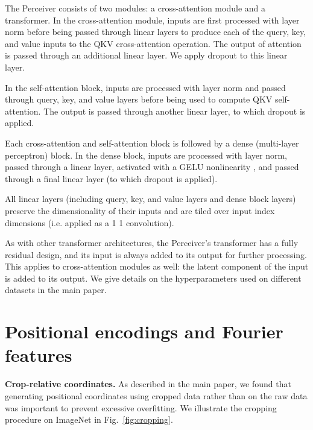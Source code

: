 \documentclass{article}
\begin{document}
The Perceiver consists of two modules: a cross-attention module and a transformer. In the cross-attention module, inputs are first processed with layer norm \cite{ba2016layer} before being passed through linear layers to produce each of the query, key, and value inputs to the QKV cross-attention operation. The output of attention is passed through an additional linear layer. We apply dropout to this linear layer.

In the self-attention block, inputs are processed with layer norm and passed through query, key, and value layers before being used to compute QKV self-attention. The output is passed through another linear layer, to which dropout is applied.

Each cross-attention and self-attention block is followed by a dense (multi-layer perceptron) block. In the dense block, inputs are processed with layer norm, passed through a linear layer, activated with a GELU nonlinearity \cite{hendrycks2016gelu}, and passed through a final linear layer (to which dropout is applied).


All linear layers (including query, key, and value layers and dense block layers) preserve the dimensionality of their inputs and are tiled over input index dimensions (i.e. applied as a 1  1 convolution).

As with other transformer architectures, the Perceiver's transformer has a fully residual design, and its input is always added to its output for further processing. This applies to cross-attention modules as well: the latent component of the input is added to its output. We give details on the hyperparameters used on different datasets in the main paper.




\section{Positional encodings and Fourier features}

\noindent \textbf{Crop-relative coordinates.} As described in the main paper, we found that generating positional coordinates using cropped data rather than on the raw data was important to prevent excessive overfitting. We illustrate the cropping procedure on ImageNet in Fig.~\ref{fig:cropping}.
\end{document}
